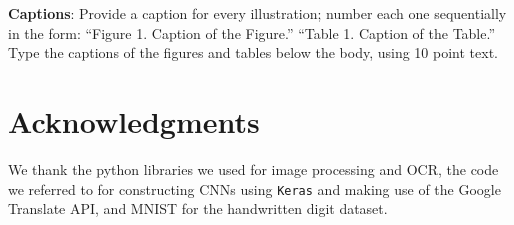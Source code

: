 \documentclass[11pt,letterpaper]{article}
\begin{document}
{\bf Captions}: Provide a caption for every illustration; number each one
sequentially in the form:  ``Figure 1. Caption of the Figure.'' ``Table 1.
Caption of the Table.''  Type the captions of the figures and 
tables below the body, using 10 point text.  

\section*{Acknowledgments}

We thank the python libraries we used for image processing and OCR, the code we referred to for constructing CNNs using {\tt Keras} and making use of the Google Translate API, and MNIST for the handwritten digit dataset.
\end{document}
